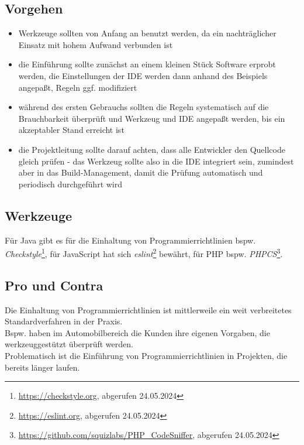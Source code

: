 \subsection*{Vorgehen}
\begin{itemize}
    \item Werkzeuge sollten von Anfang an benutzt werden, da ein nachträglicher Einsatz mit hohem Aufwand verbunden ist
    \item die Einführung sollte zunächst an einem kleinen Stück Software erprobt werden, die Einstellungen der IDE werden dann anhand des Beispiels angepaßt, Regeln ggf. modifiziert
    \item während des ersten Gebrauchs sollten die Regeln systematisch auf die Brauchbarkeit überprüft und Werkzeug und IDE  angepaßt werden, bis ein akzeptabler Stand erreicht ist
    \item die Projektleitung sollte darauf achten, dass alle Entwickler den Quellcode gleich prüfen - das Werkzeug sollte also in die IDE integriert sein, zumindest aber in das Build-Management, damit die Prüfung automatisch und periodisch durchgeführt wird
\end{itemize}

\subsection*{Werkzeuge}
Für Java gibt es für die Einhaltung von Programmierrichtlinien bspw. \textit{Checkstyle}\footnote{
    \url{https://checkstyle.org}, abgerufen 24.05.2024
}, für JavaScript hat sich \textit{eslint}\footnote{
    \url{https://eslint.org}, abgerufen 24.05.2024
} bewährt, für PHP bspw. \textit{PHPCS}\footnote{
\url{https://github.com/squizlabs/PHP_CodeSniffer}, abgerufen 24.05.2024
}.

\subsection*{Pro und Contra}
Die Einhaltung von Programmierrichtlinien ist mittlerweile ein weit verbreitetes Standardverfahren in der Praxis.\\
Bspw. haben im Automobilbereich die Kunden ihre eigenen Vorgaben, die werkzeuggestützt überprüft werden.\\
Problematisch ist die Einführung von Programmierrichtlinien in Projekten, die bereits länger laufen.



